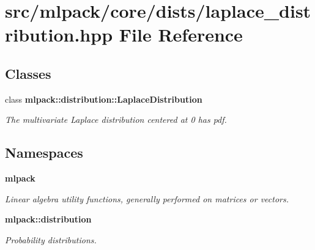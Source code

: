 \section{src/mlpack/core/dists/laplace\-\_\-distribution.hpp File Reference}
\label{laplace__distribution_8hpp}
\subsection*{Classes}
\begin{DoxyCompactItemize}
\item 
class {\bf mlpack\-::distribution\-::\-Laplace\-Distribution}
\begin{DoxyCompactList}\small\item\em The multivariate Laplace distribution centered at 0 has pdf. \end{DoxyCompactList}\end{DoxyCompactItemize}
\subsection*{Namespaces}
\begin{DoxyCompactItemize}
\item 
{\bf mlpack}
\begin{DoxyCompactList}\small\item\em Linear algebra utility functions, generally performed on matrices or vectors. \end{DoxyCompactList}\item 
{\bf mlpack\-::distribution}
\begin{DoxyCompactList}\small\item\em Probability distributions. \end{DoxyCompactList}\end{DoxyCompactItemize}

